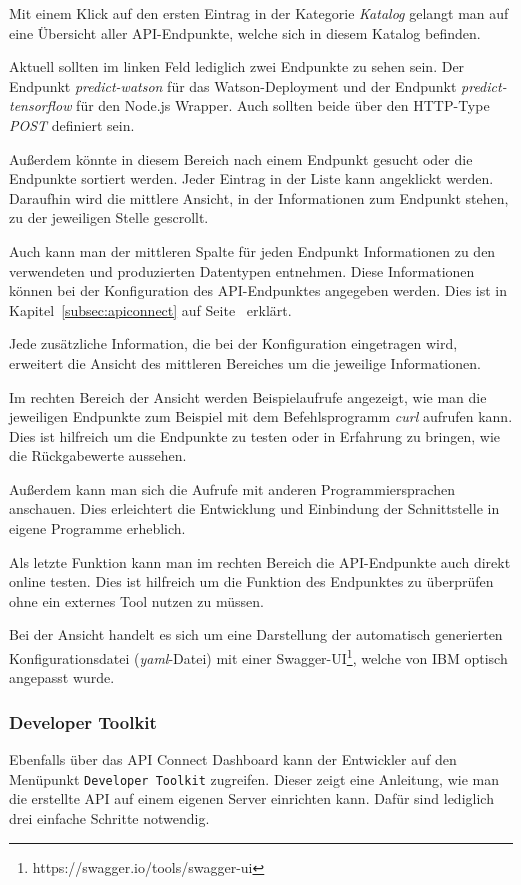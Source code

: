 Mit einem Klick auf den ersten Eintrag in der Kategorie \textit{Katalog} gelangt man auf eine Übersicht aller
API-Endpunkte, welche sich in diesem Katalog befinden.

Aktuell sollten im linken Feld lediglich zwei Endpunkte zu sehen sein. Der Endpunkt \textit{predict-watson} für das
Watson-Deployment und der Endpunkt \textit{predict-tensorflow} für den Node.js Wrapper. Auch sollten beide über
den HTTP-Type \textit{POST} definiert sein.

Außerdem könnte in diesem Bereich nach einem Endpunkt gesucht oder die Endpunkte sortiert werden. Jeder Eintrag in der Liste
kann angeklickt werden. Daraufhin wird die mittlere Ansicht, in der Informationen zum Endpunkt stehen, zu der jeweiligen
Stelle gescrollt.

Auch kann man der mittleren Spalte für jeden Endpunkt Informationen zu den verwendeten und produzierten Datentypen
entnehmen. Diese Informationen können bei der Konfiguration des API-Endpunktes angegeben werden. Dies ist in
Kapitel~\ref{subsec:apiconnect} auf Seite~\pageref{subsec:apiconnect} erklärt.

Jede zusätzliche Information, die bei der Konfiguration eingetragen wird, erweitert die Ansicht des mittleren Bereiches
um die jeweilige Informationen.

Im rechten Bereich der Ansicht werden Beispielaufrufe angezeigt, wie man die jeweiligen Endpunkte zum Beispiel mit dem
Befehlsprogramm \textit{curl} aufrufen kann. Dies ist hilfreich um die Endpunkte zu testen oder in Erfahrung zu bringen,
wie die Rückgabewerte aussehen.

Außerdem kann man sich die Aufrufe mit anderen Programmiersprachen anschauen. Dies erleichtert die Entwicklung und
Einbindung der Schnittstelle in eigene Programme erheblich.

Als letzte Funktion kann man im rechten Bereich die API-Endpunkte auch direkt online testen. Dies ist hilfreich um die
Funktion des Endpunktes zu überprüfen ohne ein externes Tool nutzen zu müssen.

Bei der Ansicht handelt es sich um eine Darstellung der automatisch generierten Konfigurationsdatei (\textit{yaml}-Datei)
mit einer Swagger-UI\footnote{https://swagger.io/tools/swagger-ui}, welche von IBM optisch angepasst wurde.

\subsubsection{Developer Toolkit}
Ebenfalls über das API Connect Dashboard kann der Entwickler auf den Menüpunkt \texttt{Developer Toolkit} zugreifen.
Dieser zeigt eine Anleitung, wie man die erstellte API auf einem eigenen Server einrichten kann. Dafür sind lediglich
drei einfache Schritte notwendig.

